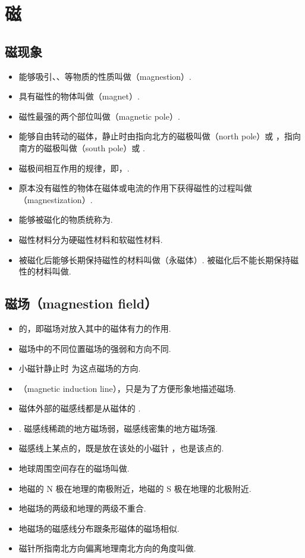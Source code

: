 \section{磁}

\subsection{磁现象}
\begin{itemize}
\item 能够吸引、、等物质的性质叫做（magnestion）.
\item 具有磁性的物体叫做（magnet）.
\item 磁性最强的两个部位叫做（magnetic pole）.
\item 能够自由转动的磁体，静止时由指向北方的磁极叫做（north pole）或 ，指向南方的磁极叫做（south pole）或 .
\item 磁极间相互作用的规律，即，.
\item 原本没有磁性的物体在磁体或电流的作用下获得磁性的过程叫做（magnestization）.
\item 能够被磁化的物质统称为.
\item 磁性材料分为硬磁性材料和软磁性材料.
\item 被磁化后能够长期保持磁性的材料叫做（永磁体）. 被磁化后不能长期保持磁性的材料叫做.
\end{itemize}

\subsection{磁场（magnestion field）}
\begin{itemize}
\item {}的，即磁场对放入其中的磁体有力的作用.
\item 磁场中的不同位置磁场的强弱和方向不同.
\item {}小磁针静止时 为这点磁场的方向.
\item {}（magnetic induction line），只是为了方便形象地描述磁场.
\item 磁体外部的磁感线都是从磁体的 .
\item {}. 磁感线稀疏的地方磁场弱，磁感线密集的地方磁场强.
\item 磁感线上某点的，既是放在该处的小磁针 ，也是该点的.
\item 地球周围空间存在的磁场叫做.
\item 地磁的 N 极在地理的南极附近，地磁的 S 极在地理的北极附近.
\item 地磁场的两级和地理的两级不重合.
\item 地磁场的磁感线分布跟条形磁体的磁场相似.
\item 磁针所指南北方向偏离地理南北方向的角度叫做.
\end{itemize}

